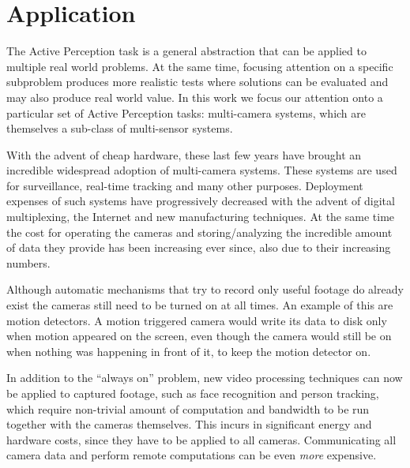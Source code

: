\section{Application}

The Active Perception task is a general abstraction that can be applied to multiple real world
problems. At the same time, focusing attention on a specific subproblem produces more realistic
tests where solutions can be evaluated and may also produce real world value.  In this work we focus
our attention onto a particular set of Active Perception tasks: multi-camera systems, which are
themselves a sub-class of multi-sensor systems.

With the advent of cheap hardware, these last few years have brought an incredible widespread
adoption of multi-camera systems. These systems are used for surveillance, real-time tracking and
many other purposes. Deployment expenses of such systems have progressively decreased with the
advent of digital multiplexing, the Internet and new manufacturing techniques. At the same time the
cost for operating the cameras and storing/analyzing the incredible amount of data they provide has
been increasing ever since, also due to their increasing numbers.


Although automatic mechanisms that try to record only useful footage do already exist the cameras
still need to be turned on at all times. An example of this are motion detectors. A motion triggered
camera would write its data to disk only when motion appeared on the screen, even though the camera
would still be on when nothing was happening in front of it, to keep the motion detector on.

In addition to the ``always on'' problem, new video processing techniques can now be applied to
captured footage, such as face recognition and person tracking, which require non-trivial amount of
computation and bandwidth to be run together with the cameras themselves. This incurs in significant
energy and hardware costs, since they have to be applied to all cameras. Communicating all camera
data and perform remote computations can be even \textit{more} expensive.


